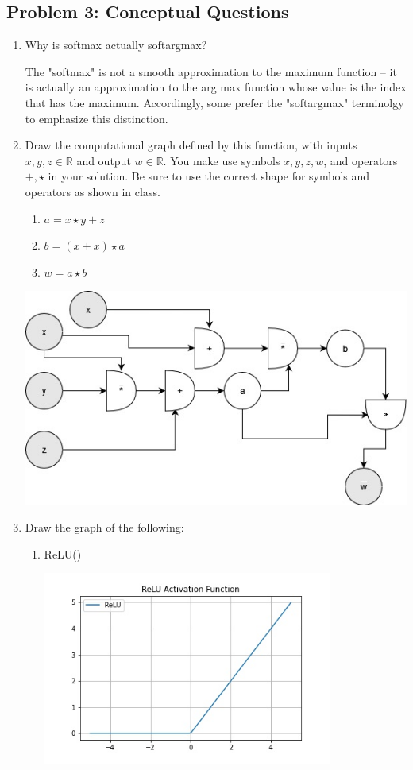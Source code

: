 \documentclass{article}
\begin{document}
\subsection*{Problem 3: Conceptual Questions}
%
\begin{enumerate}
  \item Why is softmax actually softargmax?
    \begin{tcolorbox}
      The "softmax" is not a smooth approximation to the maximum function -- it is actually an approximation to the arg max function whose value is the index that has the maximum. Accordingly, some prefer the "softargmax" terminolgy to emphasize this distinction.
  \end{tcolorbox}
  \item Draw the computational graph defined by this function, with inputs $x, y, z \in \mathbb{R}$ and output $w \in \mathbb{R}$. You make use symbols $x, y, z,w$, and operators $+,\star$ in your solution. Be sure to use the correct shape for symbols and
  operators as shown in class.
  \begin{enumerate}
    \item $a = x \star y + z  $
    \item $b = (x+x) \star a$
    \item $w = a \star b$
  \end{enumerate}
  \includegraphics[width=15cm]{"diagram.jpg"}
  \item Draw the graph of the following:
    \begin{enumerate}
      \item ReLU()
      \begin{tcolorbox}
        \includegraphics[width=9.5cm]{relu.jpg}

\end{tcolorbox}
\end{enumerate}
\end{enumerate}
\end{document}
